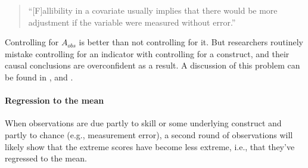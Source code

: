 \documentclass[a4paper]{tufte-book}\usepackage[]{graphicx}\usepackage[]{xcolor}
\begin{document}
\begin{quote}
``[F]allibility in a covariate usually implies that there would be more adjustment if the variable were measured without error.'' \citep[p.~569]{Huitema2011}
\end{quote}
  
Controlling for $A_{obs}$ is better than not controlling for it.
But researchers routinely mistake 
controlling for an indicator with controlling for a construct,
and their causal conclusions are overconfident as a result.
A discussion of this problem can be found in
\citet{Westfall2016}, \citet{Vanhove_HELASCOT_results}
and \citet{Berthele2017b}.

\paragraph{Regression to the mean}
When observations are due partly to skill or some underlying
construct and partly to chance (e.g., measurement error), 
a second round of observations will likely show that the 
extreme scores have become less extreme, i.e., that they've regressed
to the mean.
\end{document}
